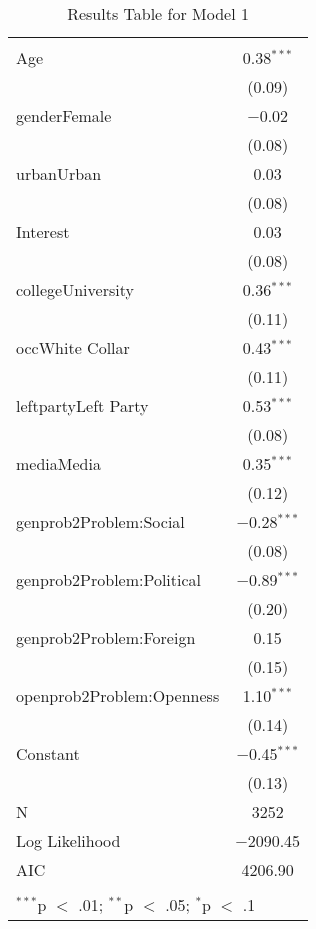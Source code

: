 
\begin{table}[!htbp] \centering 
  \caption{Results Table for Model 1} 
  \label{} 
\footnotesize 
\begin{tabular}{@{\extracolsep{5pt}}lc} 
\\[-1.8ex]\hline \\[-1.8ex] 
\hline \\[-1.8ex] 
 Age & 0.38$^{***}$ \\ 
  & (0.09) \\ 
  genderFemale & $-$0.02 \\ 
  & (0.08) \\ 
  urbanUrban & 0.03 \\ 
  & (0.08) \\ 
  Interest & 0.03 \\ 
  & (0.08) \\ 
  collegeUniversity & 0.36$^{***}$ \\ 
  & (0.11) \\ 
  occWhite Collar & 0.43$^{***}$ \\ 
  & (0.11) \\ 
  leftpartyLeft Party & 0.53$^{***}$ \\ 
  & (0.08) \\ 
  mediaMedia & 0.35$^{***}$ \\ 
  & (0.12) \\ 
  genprob2Problem:Social & $-$0.28$^{***}$ \\ 
  & (0.08) \\ 
  genprob2Problem:Political & $-$0.89$^{***}$ \\ 
  & (0.20) \\ 
  genprob2Problem:Foreign & 0.15 \\ 
  & (0.15) \\ 
  openprob2Problem:Openness & 1.10$^{***}$ \\ 
  & (0.14) \\ 
  Constant & $-$0.45$^{***}$ \\ 
  & (0.13) \\ 
 N & 3252 \\ 
Log Likelihood & $-$2090.45 \\ 
AIC & 4206.90 \\ 
\hline \\[-1.8ex] 
\multicolumn{2}{l}{$^{***}$p $<$ .01; $^{**}$p $<$ .05; $^{*}$p $<$ .1} \\ 
\end{tabular} 
\end{table} 
